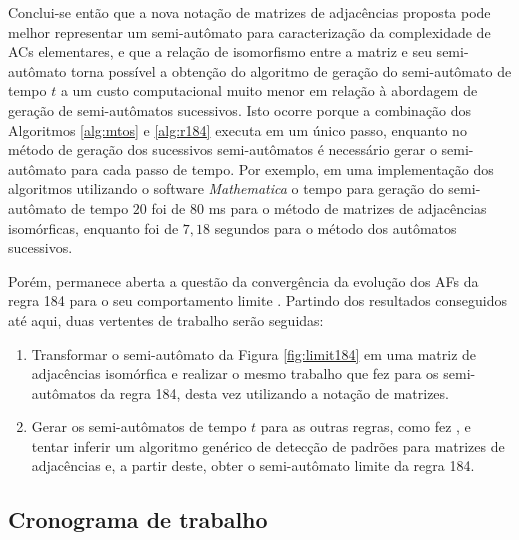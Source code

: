 \documentclass[12pt,a4paper]{article}
\begin{document}
Conclui-se então que a nova notação de matrizes de adjacências proposta
pode melhor representar um semi-autômato para caracterização da complexidade
de ACs elementares, e que a relação de isomorfismo entre
a matriz e seu semi-autômato torna possível a obtenção do algoritmo de
geração do semi-autômato de tempo $t$ a um custo computacional muito
menor em relação à abordagem de geração de semi-autômatos sucessivos.
Isto ocorre porque a combinação dos Algoritmos \ref{alg:mtos} e
\ref{alg:r184} executa em um único passo, enquanto no método de
geração dos sucessivos semi-autômatos é necessário gerar o
semi-autômato para cada passo de tempo. Por exemplo, em uma implementação dos
algoritmos utilizando o software \textit{Mathematica} o tempo para geração
do semi-autômato de tempo $20$ foi de $80$ ms para o método de matrizes
de adjacências isomórficas, enquanto foi de $7,18$ segundos para o método
dos autômatos sucessivos.

Porém, permanece aberta a questão da convergência da evolução dos AFs da
regra 184 para o seu comportamento limite . Partindo
dos resultados conseguidos até aqui, duas vertentes de trabalho serão
seguidas:

\begin{enumerate}
\item Transformar o semi-autômato da Figura \ref{fig:limit184} em uma matriz
de adjacências isomórfica e realizar o mesmo trabalho que
 fez para os semi-autômatos da regra 184, desta vez
utilizando a notação de matrizes.

\item Gerar os semi-autômatos de tempo $t$ para as outras regras, como
fez , e tentar inferir um algoritmo genérico
de detecção de padrões para matrizes de adjacências e, a partir deste,
obter o semi-autômato limite da regra 184.
\end{enumerate}

\subsection{Cronograma de trabalho}\label{sec:schedule}

\newpage
\end{document}
